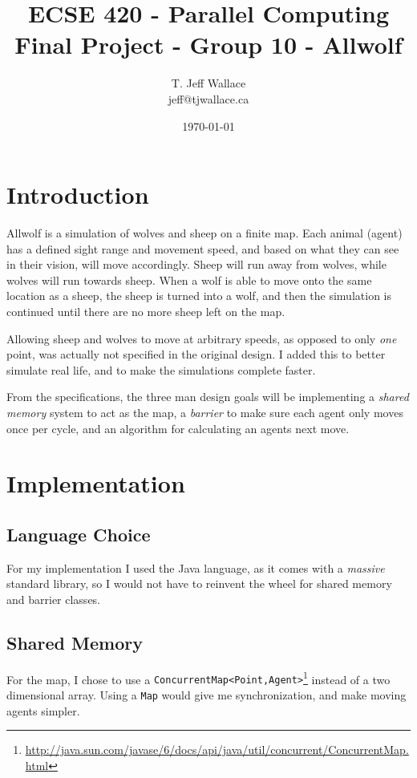 \documentclass[pdftex,10pt]{article}
\begin{document}
\title{{\sc ECSE 420 - Parallel Computing} \\ Final Project - Group 10 - Allwolf}
\author{T. Jeff Wallace \\ jeff@tjwallace.ca}
\date{\today}
\maketitle
\clearpage


\section{Introduction}\label{intro}
Allwolf is a simulation of wolves and sheep on a finite map.  Each animal (agent) has a defined sight range and movement speed, and based on what they can see in their vision, will move accordingly.  Sheep will run away from wolves, while wolves will run towards sheep.  When a wolf is able to move onto the same location as a sheep, the sheep is turned into a wolf, and then the simulation is continued until there are no more sheep left on the map.

Allowing sheep and wolves to move at arbitrary speeds, as opposed to only {\em one} point, was actually not specified in the original design.  I added this to better simulate real life, and to make the simulations complete faster.

From the specifications, the three man design goals will be implementing a {\em shared memory} system to act as the map, a {\em barrier} to make sure each agent only moves once per cycle, and an algorithm for calculating an agents next move.

\section{Implementation}\label{impl}
\subsection{Language Choice}\label{language}
For my implementation I used the Java language, as it comes with a {\em massive} standard library, so I would not have to reinvent the wheel for shared memory and barrier classes.

\subsection{Shared Memory}\label{sharedMemory}
For the map, I chose to use a {\tt ConcurrentMap<Point,Agent>}\footnote{\url{http://java.sun.com/javase/6/docs/api/java/util/concurrent/ConcurrentMap.html}} instead of a two dimensional array.  Using a {\tt Map} would give me synchronization, and make moving agents simpler.
\end{document}
